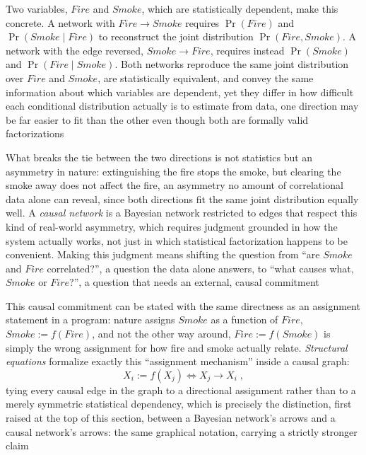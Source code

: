Two variables, $Fire$ and $Smoke$, which are statistically dependent, make
this concrete. A network with $Fire \to Smoke$ requires $\Pr(Fire)$ and
$\Pr(Smoke \mid Fire)$ to reconstruct the joint distribution $\Pr(Fire,
Smoke)$. A network with the edge reversed, $Smoke \to Fire$, requires
instead $\Pr(Smoke)$ and $\Pr(Fire \mid Smoke)$. Both networks reproduce
the same joint distribution over $Fire$ and $Smoke$, are statistically
equivalent, and convey the same information about which variables are
dependent, yet they differ in how difficult each conditional distribution
actually is to estimate from data, one direction may be far easier to fit
than the other even though both are formally valid factorizations

What breaks the tie between the two directions is not statistics but an
asymmetry in nature: extinguishing the fire stops the smoke, but clearing
the smoke away does not affect the fire, an asymmetry no amount of
correlational data alone can reveal, since both directions fit the same
joint distribution equally well. A \emph{causal network} is a Bayesian
network restricted to edges that respect this kind of real-world asymmetry,
which requires judgment grounded in how the system actually works, not
just in which statistical factorization happens to be convenient. Making
this judgment means shifting the question from ``are $Smoke$ and $Fire$
correlated?'', a question the data alone answers, to ``what causes what,
$Smoke$ or $Fire$?'', a question that needs an external, causal
commitment

This causal commitment can be stated with the same directness as an
assignment statement in a program: nature assigns $Smoke$ as a function of
$Fire$, $Smoke := f(Fire)$, and not the other way around, $Fire := f(Smoke)$
is simply the wrong assignment for how fire and smoke actually relate.
\emph{Structural equations} formalize exactly this ``assignment
mechanism'' inside a causal graph:
\begin{equation}
  \label{eq:causal-assignment-mechanism}
  X_i := f(X_j) \iff X_j \to X_i\;,
\end{equation}
tying every causal edge in the graph to a directional assignment rather
than to a merely symmetric statistical dependency, which is precisely the
distinction, first raised at the top of this section, between a Bayesian
network's arrows and a causal network's arrows: the same graphical
notation, carrying a strictly stronger claim
